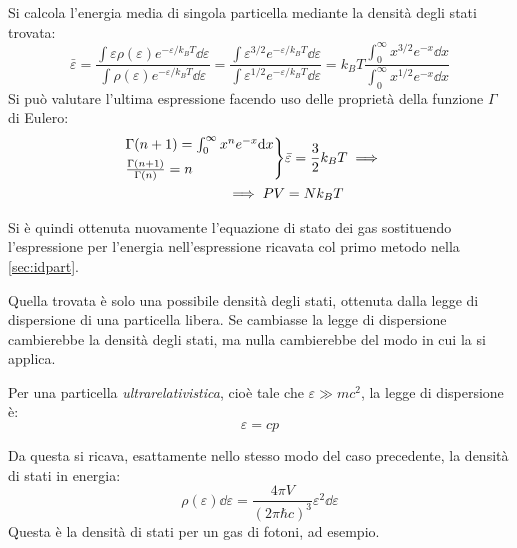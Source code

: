 \begin{es}
	Si calcola l'energia media di singola particella mediante la densità degli stati trovata:
	\begin{equation*}
	\bar{\varepsilon} = \frac{\int \varepsilon \rho(\varepsilon) e^{-\varepsilon/k_B T} \dd\varepsilon}{\int \rho(\varepsilon) e^{-\varepsilon/k_B T} \dd\varepsilon} = \frac{\int \varepsilon^{3/2} e^{-\varepsilon/k_B T} \dd\varepsilon}{\int \varepsilon^{1/2} e^{-\varepsilon/k_B T} \dd\varepsilon} = k_B T \frac{\int_0^\infty x^{3/2} e^{-x} \dd x}{\int_0^\infty x^{1/2} e^{-x} \dd x}
	\end{equation*}
	Si può valutare l'ultima espressione facendo uso delle proprietà della funzione $\Gamma$ di Eulero:
	\begin{align*}
	\begin{rcases*}
	\Gamma(n + 1) = \int_0^\infty x^n e^{-x} \dd x\\
	\frac{\Gamma(n + 1)}{\Gamma(n)} = n
	\end{rcases*}&
	\bar{\varepsilon} = \frac{3}{2} k_B T \implies\\
	\implies PV &= N k_B T
	\end{align*}
	
	Si è quindi ottenuta nuovamente l'equazione di stato dei gas sostituendo l'espressione per l'energia nell'espressione ricavata col primo metodo nella \cref{sec:idpart}.
\end{es}

Quella trovata è solo una possibile densità degli stati, ottenuta dalla legge di dispersione di una particella libera. Se cambiasse la legge di dispersione cambierebbe la densità degli stati, ma nulla cambierebbe del modo in cui la si applica.

\begin{es}
	Per una particella \textit{ultrarelativistica}, cioè tale che $\varepsilon \gg mc^2$, la legge di dispersione è:
	\begin{equation*}
		\varepsilon = cp
	\end{equation*}
	
	Da questa si ricava, esattamente nello stesso modo del caso precedente, la densità di stati in energia:
	\begin{equation*}
	\rho(\varepsilon) \dd \varepsilon = \frac{4\pi V}{(2\pi \hbar c)^3}\varepsilon^2\dd \varepsilon
	\end{equation*}
	\noindent Questa è la densità di stati per un gas di fotoni, ad esempio.
\end{es}

